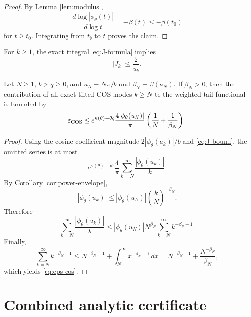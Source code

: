 \begin{proof}
By Lemma \ref{lem:modulus},
\[
\frac{d\log|\phi_{\theta}(t)|}{d\log t}=-\beta(t)\le-\beta(t_0)
\]
for $t\ge t_0$. Integrating from $t_0$ to $t$ proves the claim.
\end{proof}

For $k\ge1$, the exact integral \eqref{eq:J-formula} implies
\begin{equation}
|J_k|
\le \frac{2}{u_k}.
\label{eq:J-bound}
\end{equation}

\begin{theorem}
\label{thm:cos-tail}
Let $N\ge1$, $b>q\ge0$, and $u_N=N\pi/b$ and $\beta_N=\beta(u_N)$. If $\beta_N>0$, then the contribution of all exact tilted-COS modes $k\ge N$ to the weighted tail functional is bounded by
\begin{equation}
\varepsilon_{\mathrm{COS}}
\le
 e^{\kappa(\theta)-\theta q}
\frac{4|\phi_{\theta}(u_N)|}{\pi}
\left(\frac1N+\frac1{\beta_N}\right).
\label{eq:eps-cos}
\end{equation}
\end{theorem}

\begin{proof}
Using the cosine coefficient magnitude $2|\phi_{\theta}(u_k)|/b$ and \eqref{eq:J-bound}, the omitted series is at most
\[
e^{\kappa(\theta)-\theta q}
\frac{4}{\pi}
\sum_{k=N}^{\infty}\frac{|\phi_{\theta}(u_k)|}{k}.
\]
By Corollary \ref{cor:power-envelope},
\[
|\phi_{\theta}(u_k)|
\le
|\phi_{\theta}(u_N)|\left(\frac{k}{N}\right)^{-\beta_N}.
\]
Therefore
\[
\sum_{k=N}^{\infty}\frac{|\phi_{\theta}(u_k)|}{k}
\le
|\phi_{\theta}(u_N)|N^{\beta_N}
\sum_{k=N}^{\infty}k^{-\beta_N-1}.
\]
Finally,
\[
\sum_{k=N}^{\infty}k^{-\beta_N-1}
\le N^{-\beta_N-1}+\int_N^{\infty}x^{-\beta_N-1}\,dx
=N^{-\beta_N-1}+\frac{N^{-\beta_N}}{\beta_N},
\]
which yields \eqref{eq:eps-cos}.
\end{proof}

\section{Combined analytic certificate}

